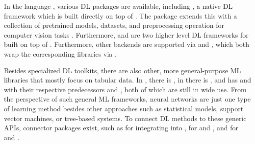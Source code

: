 \documentclass[article]{jss}
\theoremstyle{definition}
\begin{document}
In the  language \citep{ref-R-base}, various DL packages are available, including  \citep{ref-torch2025}, a native DL framework which is built directly on top of .
The  \rlang{} package extends this with a collection of pretrained models, datasets, and preprocessing operation for computer vision tasks \citep{ref-r-torchvision}.
Furthermore,  \citep{ref-luz2023} and  \citep{ref-cito2024} are two higher level DL frameworks for \rlang{} built on top of \torch{}.
Furthermore, other backends are supported via  \citep{ref-keras32025} and  \citep{ref-r-tensorflow2024}, which both wrap the corresponding \pyt{} libraries via  \citep{ref-reticulate2025}.

Besides specialized DL toolkits, there are also other, more general-purpose ML libraries that mostly focus on tabular data.
In \python, there is \sklearn{} \citep{ref-pedregosa2011scikit-learn}, in \julia{} there is  \mlj{} \citep{ref-blaom2020mlj}, and \rlang{} has \tidymodels{} \citep{ref-kuhn2020tidymodels} and  \citep{ref-mlr32019} with their respective predecessors  \citep{ref-kuhn2021caret} and  \citep{ref-bischl2016mlr}, both of which are still in wide use.
From the perspective of such general ML frameworks, neural networks are just one type of learning method besides other approaches such as statistical models, support vector machines, or tree-based systems.
To connect DL methods to these generic APIs, connector packages exist, such as  \citep{ref-skorch} for integrating  into \sklearn{},   \citep{ref-MLJFlux} for \flux{} and \mlj, and  \citep{ref-brulee2025} for \torch{} and \tidymodels.
\end{document}
